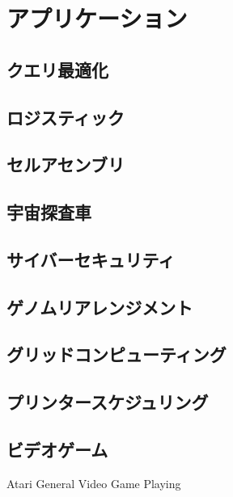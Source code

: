 \documentclass{report}
\begin{document}
\section{アプリケーション}

\subsection{クエリ最適化}

\subsection{ロジスティック}

\subsection{セルアセンブリ}

\subsection{宇宙探査車}

\subsection{サイバーセキュリティ}

\subsection{ゲノムリアレンジメント}

\subsection{グリッドコンピューティング}

\subsection{プリンタースケジュリング}

\subsection{ビデオゲーム}
Atari
General Video Game Playing




\end{document}
